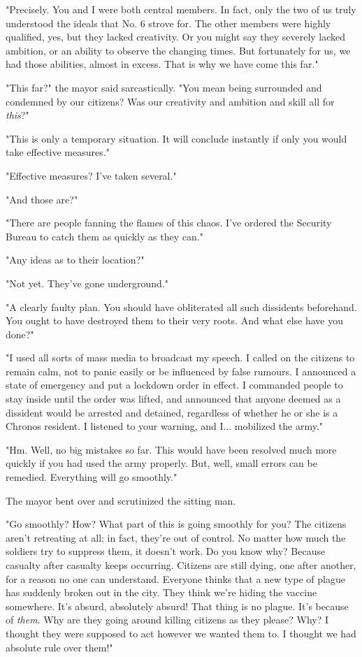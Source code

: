 "Precisely. You and I were both central members. In fact, only the two
of us truly understood the ideals that No. 6 strove for. The other
members were highly qualified, yes, but they lacked creativity. Or you
might say they severely lacked ambition, or an ability to observe the
changing times. But fortunately for us, we had those abilities, almost
in excess. That is why we have come this far."

"This far?" the mayor said sarcastically. "You mean being surrounded and
condemned by our citizens? Was our creativity and ambition and skill all
for \emph{this}?"

"This is only a temporary situation. It will conclude instantly if only
you would take effective measures."

"Effective measures? I've taken several."

"And those are?"

"There are people fanning the flames of this chaos. I've ordered the
Security Bureau to catch them as quickly as they can."

"Any ideas as to their location?"

"Not yet. They've gone underground."

"A clearly faulty plan. You should have obliterated all such dissidents
beforehand. You ought to have destroyed them to their very roots. And
what else have you done?"

"I used all sorts of mass media to broadcast my speech. I called on the
citizens to remain calm, not to panic easily or be influenced by false
rumours. I announced a state of emergency and put a lockdown order in
effect. I commanded people to stay inside until the order was lifted,
and announced that anyone deemed as a dissident would be arrested and
detained, regardless of whether he or she is a Chronos resident. I
listened to your warning, and I... mobilized the army."

"Hm. Well, no big mistakes so far. This would have been resolved much
more quickly if you had used the army properly. But, well, small errors
can be remedied. Everything will go smoothly."

The mayor bent over and scrutinized the sitting man.

"Go smoothly? How? What part of this is going smoothly for you? The
citizens aren't retreating at all; in fact, they're out of control. No
matter how much the soldiers try to suppress them, it doesn't work. Do
you know why? Because casualty after casualty keeps occurring. Citizens
are still dying, one after another, for a reason no one can understand.
Everyone thinks that a new type of plague has suddenly broken out in the
city. They think we're hiding the vaccine somewhere. It's absurd,
absolutely absurd! That thing is no plague. It's because of \emph{them}. Why
are they going around killing citizens as they please? Why? I thought
they were supposed to act however we wanted them to. I thought we had
absolute rule over them!"

